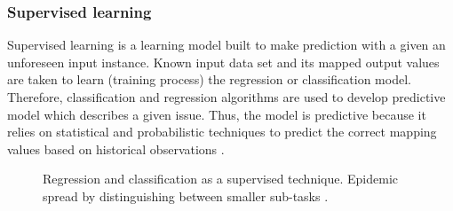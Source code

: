 \subsubsection{Supervised learning}
Supervised learning is a learning model built to make prediction with a given an unforeseen input instance. Known input data set and its mapped output values are taken to learn (training process) the regression or classification model. Therefore, classification and regression algorithms are used to develop predictive model which describes a given issue. Thus, the model is predictive because it relies on statistical and probabilistic techniques to predict the correct mapping values based on historical observations \cite{SupervisedUnsupervised1, SupervisedLearning}.

\begin{figure}[H]%
	\centering
	\qquad
	\caption{Regression and classification as a supervised technique. Epidemic spread by distinguishing between smaller sub-tasks \cite{ClassificationAndRegression}.}%
	\label{fig:SupervisedLearningFigure}%
\end{figure}

